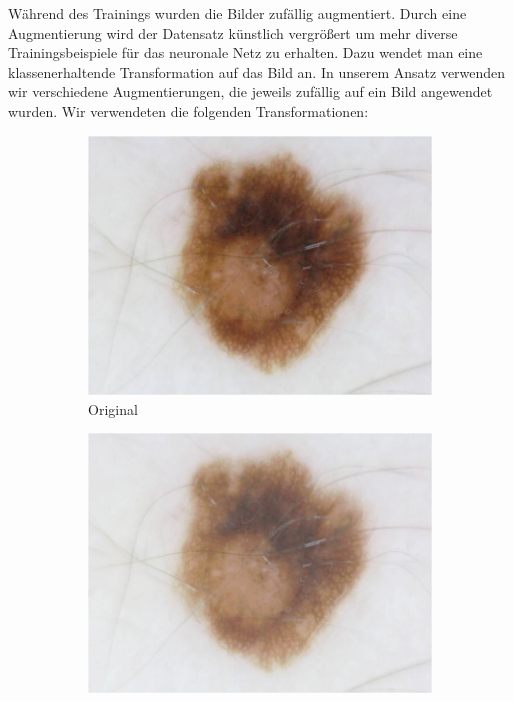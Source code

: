 Während des Trainings wurden die Bilder zufällig augmentiert. Durch eine Augmentierung wird der Datensatz künstlich vergrößert um mehr diverse Trainingsbeispiele für das neuronale Netz zu erhalten. Dazu wendet man eine klassenerhaltende Transformation auf das Bild an. In unserem Ansatz verwenden wir verschiedene Augmentierungen, die jeweils zufällig auf ein Bild angewendet wurden. Wir verwendeten die folgenden Transformationen:

\begin{figure}[t!]
	\centering
	\begin{subfigure}{0.24\linewidth}
		\includegraphics[width=\textwidth]{./pics/augmentations/original.jpg}
		\caption{Original}
		\label{subfig:aug_original}
	\end{subfigure}
	\begin{subfigure}{0.24\linewidth}
		\includegraphics[width=\textwidth]{./pics/augmentations/brightness.png}

\end{subfigure}
\end{figure}
